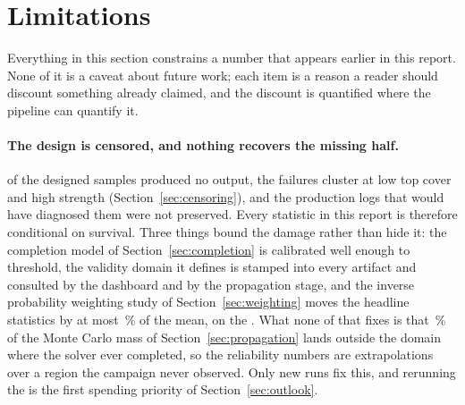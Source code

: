 \documentclass[11pt,a4paper]{article}
\begin{document}
\begin{table}[tbp]
\centering
\caption{The propagated distribution of every scalar quantity of interest. Quantiles are the
aleatory layer with the Monte Carlo standard error of the 5th percentile beside them; the final
column is the same percentile under the predictive layer, which includes the calibrated
surrogate uncertainty. \OutOfDomainPct\,\% of the Monte Carlo mass lies outside the validity
domain, and the roughness caveat of Table~\ref{tab:reliability} applies here too.}
\label{tab:quantiles}
\footnotesize

\end{table}

\section{Limitations}
\label{sec:limitations}
Everything in this section constrains a number that appears earlier in this report. None of it
is a caveat about future work; each item is a reason a reader should discount something already
claimed, and the discount is quantified where the pipeline can quantify it.

\paragraph{The design is censored, and nothing recovers the missing half.}
\NMissing{} of the \NDesign{} designed samples produced no output, the failures cluster at low
top cover and high strength (Section~\ref{sec:censoring}), and the production logs that would
have diagnosed them were not preserved. Every statistic in this report is therefore conditional
on survival. Three things bound the damage rather than hide it: the completion model of
Section~\ref{sec:completion} is calibrated well enough to threshold, the validity domain it
defines is stamped into every artifact and consulted by the dashboard and by the propagation
stage, and the inverse probability weighting study of Section~\ref{sec:weighting} moves the
headline statistics by at most \WeightLargestShift\,\% of the mean, on the
\WeightLargestQoI{}. What none of that fixes is that \OutOfDomainPct\,\% of the Monte Carlo mass
of Section~\ref{sec:propagation} lands outside the domain where the solver ever completed, so
the reliability numbers are extrapolations over a region the campaign never observed. Only new
runs fix this, and rerunning the \NMissing{} is the first spending priority of
Section~\ref{sec:outlook}.
\end{document}
